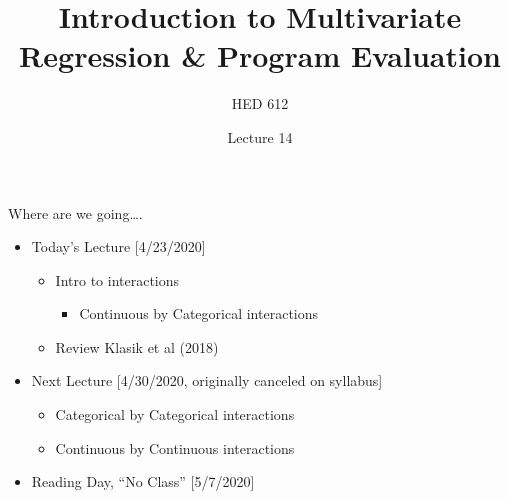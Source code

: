 \documentclass[8pt,ignorenonframetext,dvipsnames]{beamer}
\title{Introduction to Multivariate Regression \& Program Evaluation}
\subtitle{HED 612}
\author{Lecture 14}
\date{}
\providecommand{\tightlist}{%
  \setlength{\itemsep}{0pt}\setlength{\parskip}{0pt}}
\let\olditem\item
\renewcommand{\item}{%
  \olditem\vspace{4pt}
}
\begin{document}
\frame{\titlepage}

\begin{frame}
\tableofcontents[hideallsubsections]
\end{frame}
\begin{frame}{Where are we going\ldots{}.}
\protect\hypertarget{where-are-we-going.}{}

\begin{itemize}
\tightlist
\item
  Today's Lecture {[}4/23/2020{]}

  \begin{itemize}
  \tightlist
  \item
    Intro to interactions

    \begin{itemize}
    \tightlist
    \item
      Continuous by Categorical interactions
    \end{itemize}
  \item
    Review Klasik et al (2018)
  \end{itemize}
\end{itemize}

\medskip

\begin{itemize}
\tightlist
\item
  Next Lecture {[}4/30/2020, originally canceled on syllabus{]}

  \begin{itemize}
  \tightlist
  \item
    Categorical by Categorical interactions
  \item
    Continuous by Continuous interactions
  \end{itemize}
\end{itemize}

\medskip

\begin{itemize}
\tightlist
\item
  Reading Day, ``No Class'' {[}5/7/2020{]}
\end{itemize}

\end{frame}
\end{document}
